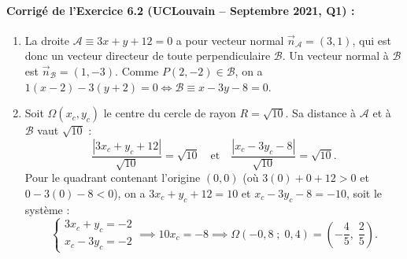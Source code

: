 \paragraph{Corrigé de l'Exercice 6.2 (UCLouvain -- Septembre 2021, Q1) :}
\begin{enumerate}[label=(\alph*)]
    \item La droite $\mathcal{A} \equiv 3x + y + 12 = 0$ a pour vecteur normal $\vec{n}_{\mathcal{A}} = (3, 1)$, qui est donc un vecteur directeur de toute perpendiculaire $\mathcal{B}$. Un vecteur normal à $\mathcal{B}$ est $\vec{n}_{\mathcal{B}} = (1, -3)$. Comme $P(2, -2) \in \mathcal{B}$, on a $1(x-2) - 3(y+2) = 0 \iff \boxed{\mathcal{B} \equiv x - 3y - 8 = 0}$.
    \item Soit $\Omega(x_c, y_c)$ le centre du cercle de rayon $R = \sqrt{10}$. Sa distance à $\mathcal{A}$ et à $\mathcal{B}$ vaut $\sqrt{10}$ :
    \[
        \frac{|3x_c + y_c + 12|}{\sqrt{10}} = \sqrt{10} \quad \text{et} \quad \frac{|x_c - 3y_c - 8|}{\sqrt{10}} = \sqrt{10}.
    \]
    Pour le quadrant contenant l'origine $(0,0)$ (où $3(0)+0+12 > 0$ et $0-3(0)-8 < 0$), on a $3x_c + y_c + 12 = 10$ et $x_c - 3y_c - 8 = -10$, soit le système :
    \[
        \begin{cases} 3x_c + y_c = -2 \\ x_c - 3y_c = -2 \end{cases} \implies 10x_c = -8 \implies \boxed{\Omega(-0,8\;;\; 0,4) = \left(-\frac{4}{5},\; \frac{2}{5}\right)}.
    \]
\end{enumerate}

